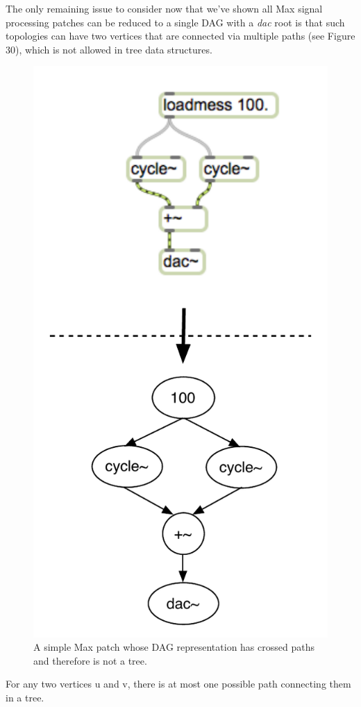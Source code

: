 \documentclass[12pt]{report} 	%
\numberwithin{figure}{chapter}
\numberwithin{table}{chapter}
\numberwithin{equation}{chapter}
\begin{document}
\begin{flushleft}
The only remaining issue to consider now that we've shown all Max signal processing patches can be reduced to a single DAG with a \textit{dac\texttildelow{}} root is that such topologies can  have two vertices that are connected via multiple paths (see Figure 30), which is not allowed in tree data structures.
\begin{figure}[h!]
\begin{center}
\includegraphics[scale=0.8]{MaxDAGsCrossedPaths}
\caption[A DAG with crossed paths]{A simple Max patch whose DAG representation has crossed paths and therefore is not a tree.}
\end{center}
\vspace{6pt}
\end{figure}
For any two vertices u and v, there is at most one possible path connecting them in a tree. 


\end{flushleft}
\end{document}

